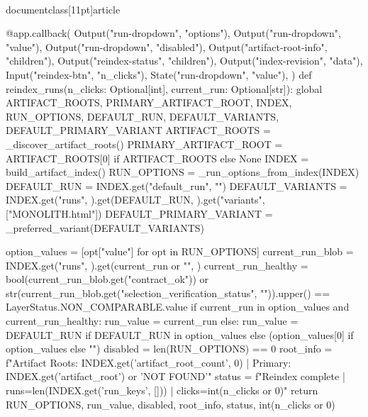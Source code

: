 \\documentclass[11pt]{article}
\begin{document}
\begin{CodeBlock}
{{{{{{{{@app.callback(
    Output("run-dropdown", "options"),
    Output("run-dropdown", "value"),
    Output("run-dropdown", "disabled"),
    Output("artifact-root-info", "children"),
    Output("reindex-status", "children"),
    Output("index-revision", "data"),
    Input("reindex-btn", "n_clicks"),
    State("run-dropdown", "value"),
)
def reindex_runs(n_clicks: Optional[int], current_run: Optional[str]):
    global ARTIFACT_ROOTS, PRIMARY_ARTIFACT_ROOT, INDEX, RUN_OPTIONS, DEFAULT_RUN, DEFAULT_VARIANTS, DEFAULT_PRIMARY_VARIANT
    ARTIFACT_ROOTS = _discover_artifact_roots()
    PRIMARY_ARTIFACT_ROOT = ARTIFACT_ROOTS[0] if ARTIFACT_ROOTS else None
    INDEX = build_artifact_index()
    RUN_OPTIONS = _run_options_from_index(INDEX)
    DEFAULT_RUN = INDEX.get("default_run", "")
    DEFAULT_VARIANTS = INDEX.get("runs", {}).get(DEFAULT_RUN, {}).get("variants", ["MONOLITH.html"])
    DEFAULT_PRIMARY_VARIANT = _preferred_variant(DEFAULT_VARIANTS)

    option_values = [opt["value"] for opt in RUN_OPTIONS]
    current_run_blob = INDEX.get("runs", {}).get(current_run or "", {})
    current_run_healthy = bool(current_run_blob.get("contract_ok")) or str(current_run_blob.get("selection_verification_status", "")).upper() == LayerStatus.NON_COMPARABLE.value
    if current_run in option_values and current_run_healthy:
        run_value = current_run
    else:
        run_value = DEFAULT_RUN if DEFAULT_RUN in option_values else (option_values[0] if option_values else "")
    disabled = len(RUN_OPTIONS) == 0
    root_info = f"Artifact Roots: {INDEX.get('artifact_root_count', 0)} | Primary: {INDEX.get('artifact_root') or 'NOT FOUND'}"
    status = f"Reindex complete | runs={len(INDEX.get('run_keys', []))} | clicks={int(n_clicks or 0)}"
    return RUN_OPTIONS, run_value, disabled, root_info, status, int(n_clicks or 0)


}}}}}}}}
\end{CodeBlock}
\end{document}

